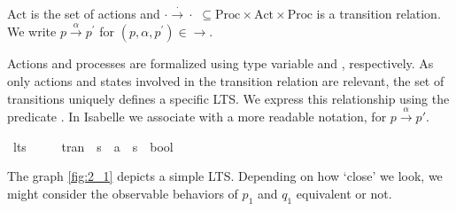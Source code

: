 \begin{isabellebody}
\begin{isamarkuptext}
{$\text{Act}$ is the set of actions and $\cdot\xrightarrow{\cdot}\cdot$ $\subseteq \text{Proc} \times \text{Act} \times \text{Proc}$ is a transition relation.
We write $p \xrightarrow{\alpha} p^\prime$ for $(p, \alpha, p^\prime)\in \rightarrow$.}%
\end{isamarkuptext}\isamarkuptrue%
%
\begin{isamarkuptext}%
Actions and processes are formalized using type variable  and , respectively. As only actions and states involved in the transition relation are relevant, 
the set of transitions uniquely defines a specific LTS. We express this relationship using the predicate . In Isabelle we associate  with a more readable notation,  for $p \xrightarrow{\alpha} p'$.%
\end{isamarkuptext}\isamarkuptrue%
\isamarkupfalse%
\ lts\ {\isacharequal}{\kern0pt}\ \isanewline
\ \ \ tran\ {\isacharcolon}{\kern0pt}{\isacharcolon}{\kern0pt}\ {\isacartoucheopen}{\isacharprime}{\kern0pt}s\ {\isasymRightarrow}\ {\isacharprime}{\kern0pt}a\ {\isasymRightarrow}\ {\isacharprime}{\kern0pt}s\ {\isasymRightarrow}\ bool{\isacartoucheclose}\ \isanewline
\ \ \ \ {\isacharparenleft}{\kern0pt}{\isachardoublequoteopen}{\isacharunderscore}{\kern0pt}\ {\isasymmapsto}{\isacharunderscore}{\kern0pt}\ {\isacharunderscore}{\kern0pt}{\isachardoublequoteclose}\ {\isacharbrackleft}{\kern0pt}{}{}{\isacharcomma}{\kern0pt}\ {}{}{\isacharcomma}{\kern0pt}\ {}{}{\isacharbrackright}{\kern0pt}\ {}{}{\isacharparenright}{\kern0pt}\isanewline
{}%
\begin{isamarkuptext}%
The graph \ref{fig:2_1} depicts a simple LTS. Depending on how `close' we look, we might consider the observable behaviors of $p_1$ and $q_1$ equivalent or not.%
\end{isamarkuptext}\isamarkuptrue%
%
\begin{isamarkuptext}%
\begin{figure}[htbp]
    \centering
{}
\end{figure}
\end{isamarkuptext}
\end{isabellebody}
